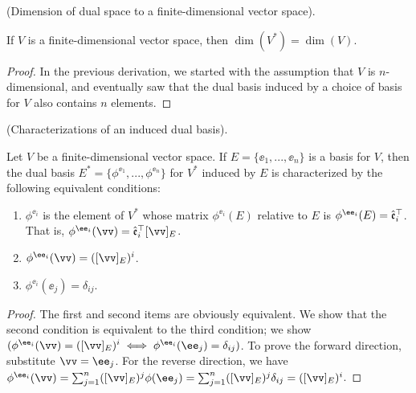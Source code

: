 \begin{theorem}
\label{ch::motivated_intro::deriv::dim_dual_space}
    (Dimension of dual space to a finite-dimensional vector space).
    
    If $V$ is a finite-dimensional vector space, then $\dim(V^*) = \dim(V)$.
\end{theorem}

\begin{proof}
    In the previous derivation, we started with the assumption that $V$ is $n$-dimensional, and eventually saw that the dual basis induced by a choice of basis for $V$ also contains $n$ elements.
\end{proof}

\begin{theorem}
\label{ch::motivated_intro::thm::characterizations_of_induced_dual_basis}
    (Characterizations of an induced dual basis).
     
    Let $V$ be a finite-dimensional vector space. If $E = \{\ee_1, ..., \ee_n\}$ is a basis for $V$, then the dual basis $E^* = \{\phi^{\ee_1}, ..., \phi^{\ee_n}\}$ for $V^*$ induced by $E$ is characterized by the following equivalent conditions:
             
    \begin{enumerate}
        \item $\phi^{\ee_i}$ is the element of $V^*$ whose matrix $\phi^{\ee_i}(E)$ relative to $E$ is $\phi^{\ee_i}(E) = \see_i^\top$. That is, $\phi^{\ee_i}(\vv) = \see_i^\top [\vv]_E$.
        \item $\phi^{\ee_i}(\vv) = ([\vv]_E)^i$.
        \item $\phi^{\ee_i}(\ee_j) = \delta_{ij}$.
    \end{enumerate}
\end{theorem}

\begin{proof}
    The first and second items are obviously equivalent. We show that the second condition is equivalent to the third condition; we show $(\phi^{\ee_i}(\vv) = ([\vv]_E)^i \iff \phi^{\ee_i}(\ee_j) = \delta_{ij})$. To prove the forward direction, substitute $\vv = \ee_j$. For the reverse direction, we have $\phi^{\ee_i}(\vv) = \sum_{j = 1}^n ([\vv]_E)^j \phi(\ee_j) = \sum_{j = 1}^n ([\vv]_E)^j \delta_{ij} = ([\vv]_E)^i$.
\end{proof}

